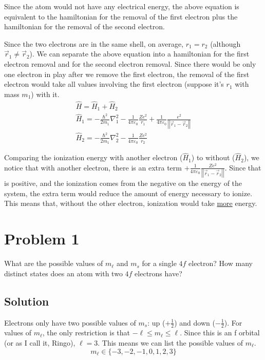 \documentclass[12pt]{article}
\begin{document}
                \normalsize
                Since the atom would not have any electrical energy, the above equation is equivalent to the hamiltonian for the removal of the first electron plus the hamiltonian for the removal of the second electron.
                
                Since the two electrons are in the same shell, on average, $r_1 = r_2$ (although $\vec{r}_1 \neq \vec{r}_2$).
                We can separate the above equation into a hamiltonian for the first electron removal and for the second electron removal.
                Since there would be only one electron in play after we remove the first electron, the removal of the first electron would take all values involving the first electron (suppose it's $r_1$ with mass $m_1$) with it.
                \begin{gather}
                    \hat{H} = \hat{H}_1 + \hat{H}_2\\
                    \hat{H}_1 = -\frac{\hbar^2}{2m_1}\nabla_1^2 - \frac{1}{4\pi\varepsilon_0} \frac{Ze^2}{r_1} + \frac{1}{4\pi\varepsilon_0} \frac{e^2}{\left| \left| \vec{r}_1 - \vec{r}_2 \right| \right|}\\
                    \hat{H}_2 = - \frac{\hbar^2}{2m_1}\nabla_2^2 - \frac{1}{4\pi\varepsilon_0} \frac{Ze^2}{r_2}
                \end{gather}

                Comparing the ionization energy with another electron ($\hat{H}_1$) to without ($\hat{H}_2$), we notice that with another electron, there is an extra term $+ \frac{1}{4\pi\varepsilon_0} \frac{Ze^2}{\left| \left| \vec{r}_1 - \vec{r}_2 \right| \right|}$.
                Since that is positive, and the ionization comes from the negative on the energy of the system, the extra term would reduce the amount of energy necessary to ionize.
                This means that, without the other electron, ionization would take \underline{more} energy.
    \pagebreak

    \section{Problem 1}
        What are the possible values of $m_\ell$ and $m_s$ for a single $4f$ electron? 
        How many distinct states does an atom with two $4f$ electrons have?

        \subsection{Solution}
            Electrons only have two possible values of $m_s$: up ($+\frac{1}{2}$) and down ($-\frac{1}{2}$).
            For values of $m_\ell$, the only restriction is that $-\ell \leq m_\ell \leq \ell$.
            Since this is an f orbital (or as I call it, Ringo), $\ell = 3$.
            This means we can list the possible values of $m_\ell$.
            \begin{equation}
                m_\ell \in \{-3,-2,-1,0,1,2,3\}
            \end{equation}
\end{document}
